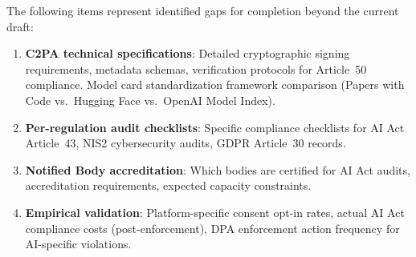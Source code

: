 \documentclass[11pt,a4paper]{article}
\begin{document}
The following items represent identified gaps for completion beyond the current draft:

\begin{enumerate}
  \item \textbf{C2PA technical specifications}: Detailed cryptographic signing requirements, metadata schemas, verification protocols for Article~50 compliance. Model card standardization framework comparison (Papers with Code vs.\ Hugging Face vs.\ OpenAI Model Index).
  \item \textbf{Per-regulation audit checklists}: Specific compliance checklists for AI Act Article~43, NIS2 cybersecurity audits, GDPR Article~30 records.
  \item \textbf{Notified Body accreditation}: Which bodies are certified for AI Act audits, accreditation requirements, expected capacity constraints.
  \item \textbf{Empirical validation}: Platform-specific consent opt-in rates, actual AI Act compliance costs (post-enforcement), DPA enforcement action frequency for AI-specific violations.
\end{enumerate}
\end{document}
